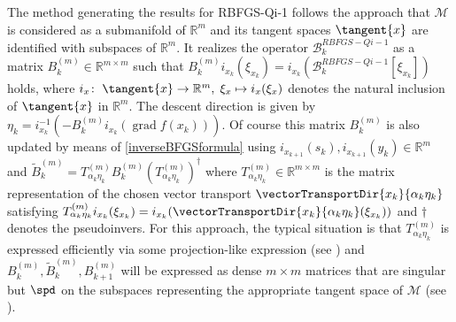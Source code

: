 The method generating the results for RBFGS-Qi-1 follows the approach that $\mathcal{M}$ is considered as a submanifold of $\mathbb{R}^{m}$ and its tangent spaces $\tangent{x}$ are identified with subspaces of $\mathbb{R}^{m}$. It realizes the operator $\mathcal{B}^{RBFGS-Qi-1}_k$ as a matrix $B^{(m)}_k \in \mathbb{R}^{m \times m}$ such that $B^{(m)}_k i_{x_k}(\xi_{x_k}) = i_{x_k}(\mathcal{B}^{RBFGS-Qi-1}_k[\xi_{x_k}])$ holds, where $i_x \colon \; \tangent{x} \to \mathbb{R}^{m}, \; \xi_x \mapsto i_x(\xi_x)$ denotes the natural inclusion of $\tangent{x}$ in $\mathbb{R}^{m}$. The descent direction is given by $\eta_k = i^{-1}_{x_k}(-B^{(m)}_k i_{x_k}(\operatorname{grad} f(x_k)))$. Of course this matrix $B^{(m)}_k$ is also updated by means of \cref{inverseBFGSformula} using $i_{x_{k+1}}(s_k), i_{x_{k+1}}(y_k) \in \mathbb{R}^m$ and $\widetilde{B}^{(m)}_k = T^{(m)}_{\alpha_k \eta_k} B^{(m)}_k (T^{(m)}_{\alpha_k \eta_k})^{\dagger}$ where $T^{(m)}_{\alpha_k \eta_k} \in \mathbb{R}^{m \times m}$ is the matrix representation of the chosen vector transport $\vectorTransportDir{x_k}{\alpha_k \eta_k}$ satisfying $T^{(m)}_{\alpha_k \eta_k} i_{x_k}(\xi_{x_k}) = i_{x_k}(\vectorTransportDir{x_k}{\alpha_k \eta_k}(\xi_{x_k}))$ and $\dagger$ denotes the pseudoinvers. For this approach, the typical situation is that $T^{(m)}_{\alpha_k \eta_k}$ is expressed efficiently via some projection-like expression (see \cite[p.~44-46]{Qi:2011}) and $B^{(m)}_k, \widetilde{B}^{(m)}_k, B^{(m)}_{k+1}$ will be expressed as dense $m \times m$ matrices that are singular but $\spd$ on the subspaces representing the appropriate tangent space of $\mathcal{M}$ (see \cite[3.3.1~Approach~1]{Qi:2011}). \\
